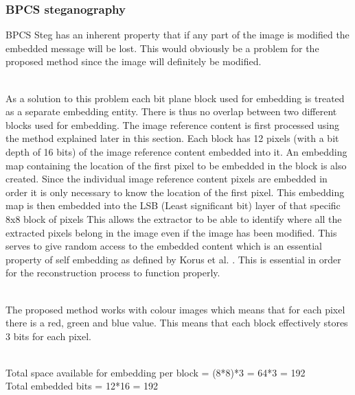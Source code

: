 \documentclass[12pt]{article}
\begin{document}
\subsubsection{BPCS steganography} 
\label{bpcsSteg}

BPCS Steg has an inherent property that if any part of the image is modified the embedded message will be lost.
This would obviously be a problem for the proposed method since the image will definitely be modified.

\hspace{0pt} \\
As a solution to this problem each bit plane block used for embedding is treated as a separate embedding entity.
There is thus no overlap between two different blocks used for embedding.
The image reference content is first processed using the method explained later in this section.
Each block has 12 pixels (with a bit depth of 16 bits) of the image reference content embedded into it.
An embedding map containing the location of the first pixel to be embedded in the block is also created.
Since the individual image reference content pixels are embedded in order it is only necessary to know the location of the first pixel.
This embedding map is then embedded into the LSB (Least significant bit) layer of that specific 8x8 block of pixels 
This allows the extractor to be able to identify where all the extracted pixels belong in the image even if the image has been modified.
This serves to give random access to the embedded content which is an essential property of self embedding as defined by Korus et al. \cite{korus2013efficient}.
This is essential in order for the reconstruction process to function properly.

\hspace{0pt} \\
The proposed method works with colour images which means that for each pixel there is a red, green and blue value. This means that each block effectively stores 3 bits for each pixel.

\hspace{0pt} \\
Total space available for embedding per block = (8*8)*3 = 64*3 = 192
\hspace{0pt} \\
Total embedded bits = 12*16 = 192
\end{document}
